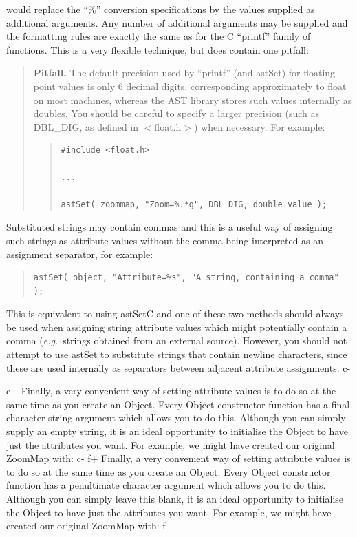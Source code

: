 \documentclass[twoside,11pt]{article}
\begin{document}
would replace the ``\%'' conversion specifications by the values
supplied as additional arguments. Any number of additional arguments
may be supplied and the formatting rules are exactly the same as for
the C ``printf'' family of functions. This is a very flexible
technique, but does contain one pitfall:

\begin{quote}
{\bf{Pitfall.}} The default precision used by ``printf'' (and astSet)
for floating point values is only 6 decimal digits, corresponding
approximately to float on most machines, whereas the AST library
stores such values internally as doubles. You should be careful to
specify a larger precision (such as DBL\_DIG, as defined in
$<$float.h$>$) when necessary. For example:

\begin{quote}
\small
\begin{verbatim}
#include <float.h>

...

astSet( zoommap, "Zoom=%.*g", DBL_DIG, double_value );
\end{verbatim}
\normalsize
\end{quote}
\end{quote}

Substituted strings may contain commas and this is a useful way of
assigning such strings as attribute values without the comma being
interpreted as an assignment separator, for example:

\begin{quote}
\small
\begin{verbatim}
astSet( object, "Attribute=%s", "A string, containing a comma" );
\end{verbatim}
\normalsize
\end{quote}

This is equivalent to using astSetC and one of these two methods
should always be used when assigning string attribute values which
might potentially contain a comma ({\em{e.g.}}\ strings obtained from
an external source). However, you should not attempt to use astSet to
substitute strings that contain newline characters, since these are
used internally as separators between adjacent attribute assignments.
c-
\label{ss:attributeinitialisation}

c+
Finally, a very convenient way of setting attribute values is to do so
at the same time as you create an Object. Every Object constructor
function has a final character string argument which allows you to do
this. Although you can simply supply an empty string, it is an ideal
opportunity to initialise the Object to have just the attributes you
want. For example, we might have created our original ZoomMap with:
c-
f+
Finally, a very convenient way of setting attribute values is to do so
at the same time as you create an Object. Every Object constructor
function has a penultimate character argument which allows you to do
this. Although you can simply leave this blank, it is an ideal
opportunity to initialise the Object to have just the attributes you
want. For example, we might have created our original ZoomMap with:
f-
\end{document}
